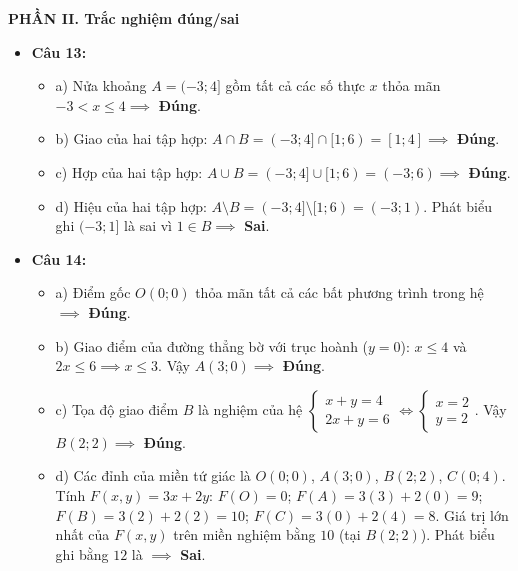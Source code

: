 \documentclass[12pt,a4paper]{article}
\begin{document}
\vspace{0.15cm}
\textbf{PHẦN II. Trắc nghiệm đúng/sai}
\begin{itemize}[leftmargin=0.6cm, itemsep=1.5pt, topsep=1pt]
    \item \textbf{Câu 13:}
    \begin{itemize}[itemsep=1pt]
        \item a) Nửa khoảng $A = (-3; 4]$ gồm tất cả các số thực $x$ thỏa mãn $-3 < x \le 4 \implies$ \textbf{Đúng}.
        \item b) Giao của hai tập hợp: $A \cap B = (-3; 4] \cap [1; 6) = [1; 4] \implies$ \textbf{Đúng}.
        \item c) Hợp của hai tập hợp: $A \cup B = (-3; 4] \cup [1; 6) = (-3; 6) \implies$ \textbf{Đúng}.
        \item d) Hiệu của hai tập hợp: $A \setminus B = (-3; 4] \setminus [1; 6) = (-3; 1)$. Phát biểu ghi $(-3; 1]$ là sai vì $1 \in B \implies$ \textbf{Sai}.
    \end{itemize}

    \item \textbf{Câu 14:}
    \begin{itemize}[itemsep=1pt]
        \item a) Điểm gốc $O(0; 0)$ thỏa mãn tất cả các bất phương trình trong hệ $\implies$ \textbf{Đúng}.
        \item b) Giao điểm của đường thẳng bờ với trục hoành ($y = 0$): $x \le 4$ và $2x \le 6 \implies x \le 3$. Vậy $A(3; 0) \implies$ \textbf{Đúng}.
        \item c) Tọa độ giao điểm $B$ là nghiệm của hệ $\begin{cases} x + y = 4 \\ 2x + y = 6 \end{cases} \iff \begin{cases} x = 2 \\ y = 2 \end{cases}$. Vậy $B(2; 2) \implies$ \textbf{Đúng}.
        \item d) Các đỉnh của miền tứ giác là $O(0; 0)$, $A(3; 0)$, $B(2; 2)$, $C(0; 4)$.
        Tính $F(x, y) = 3x + 2y$:
        $F(O) = 0$; $F(A) = 3(3) + 2(0) = 9$; $F(B) = 3(2) + 2(2) = 10$; $F(C) = 3(0) + 2(4) = 8$.
        Giá trị lớn nhất của $F(x, y)$ trên miền nghiệm bằng $10$ (tại $B(2; 2)$). Phát biểu ghi bằng $12$ là $\implies$ \textbf{Sai}.
    \end{itemize}
\end{itemize}
\end{document}
